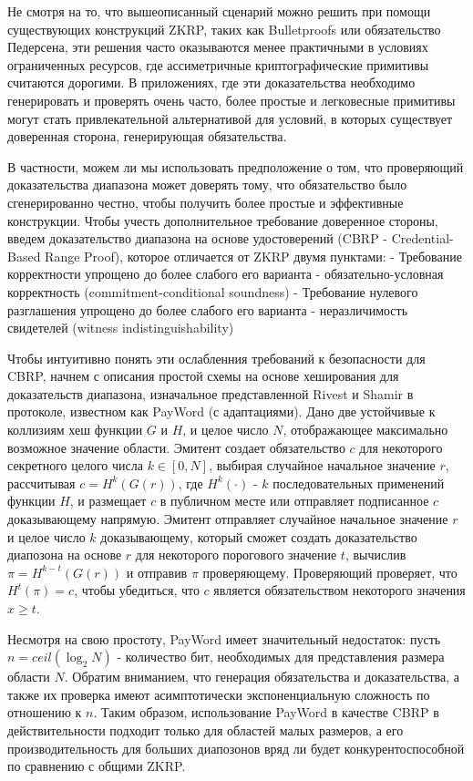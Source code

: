 Не смотря на то, что вышеописанный сценарий можно решить при помощи существующих конструкций ZKRP, таких как Bulletproofs или обязательство Педерсена, эти решения часто оказываются менее практичными в условиях ограниченных ресурсов, где ассиметричные криптографические примитивы считаются дорогими.
В приложениях, где эти доказательства необходимо генерировать и проверять очень часто, более простые и легковесные примитивы могут стать привлекательной альтернативой для условий, в которых существует доверенная сторона, генерирующая обязательства.

В частности, можем ли мы использовать предположение о том, что проверяющий доказательства диапазона может доверять тому, что обязательство было сгенерированно честно, чтобы получить более простые и эффективные конструкции.
Чтобы учесть дополнительное требование доверенное стороны, введем доказательство диапазона на основе удостоверений (CBRP - Credential-Based Range Proof), которое отличается от ZKRP двумя пунктами:
- Требование корректности упрощено до более слабого его варианта - обязательно-условная корректность (commitment-conditional soundness)
- Требование нулевого разглашения упрощено до более слабого его варианта - неразличимость свидетелей (witness indistinguishability)

Чтобы интуитивно понять эти ослабленния требований к безопасности для CBRP, начнем с описания простой схемы на основе хеширования для доказательств диапазона, изначальное представленной Rivest и Shamir \cite{10.1007/3-540-62494-5_6} в протоколе, известном как PayWord (с адаптациями).
Дано две устойчивые к коллизиям хеш функции $G$ и $H$, и целое число $N$, отображающее максимально возможное значение области.
Эмитент создает обязательство $c$ для некоторого секретного целого числа $k \in [0, N]$, выбирая случайное начальное значение $r$, рассчитывая $c = H^k(G(r))$, где $H^k(\cdot)$ - $k$ последовательных применений функции $H$, и размещает $c$ в публичном месте или отправляет подписанное $c$ доказывающему напрямую.
Эмитент отправляет случайное начальное значение $r$ и целое число $k$ доказывающему, который сможет создать доказательство диапозона на основе $r$ для некоторого порогового значение $t$, вычислив $\pi = H^{k - t}(G(r))$ и отправив $\pi$ проверяющему.
Проверяющий проверяет, что $H^t(\pi) = c$, чтобы убедиться, что $c$ является обязательством некоторого значения $x \geq t$.

Несмотря на свою простоту, PayWord имеет значительный недостаток: пусть $n = ceil(\log_2 N)$ - количество бит, необходимых для представления размера области $N$.
Обратим вниманием, что генерация обязательства и доказательства, а также их проверка имеют асимптотически экспоненциальную сложность по отношению к $n$.
Таким образом, использование PayWord в качестве CBRP в действительности подходит только для областей малых размеров, а его производительность для больших диапозонов вряд ли будет конкурентоспособной по сравнению с общими ZKRP.

